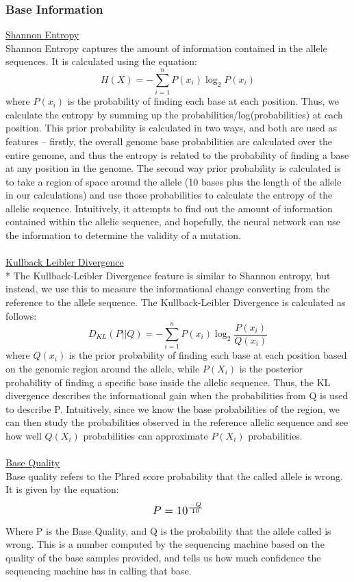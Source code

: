 \documentclass{article}
\begin{document}
\subsubsection{Base Information}
\underline{Shannon Entropy}\\
Shannon Entropy captures the amount of information contained in the allele sequences. It is calculated using the equation:
\begin{equation}
H(X) = -\sum_{i=1}^{n}P(x_i)\log_{2}P(x_i)
\end{equation}
where $P(x_i)$ is the probability of finding each base at each position. Thus, we calculate the entropy by summing up the probabilities/log(probabilities) at each position. This prior probability is calculated in two ways, and both are used as features -- firstly, the overall genome base probabilities are calculated over the entire genome, and thus the entropy is related to the probability of finding a base at any position in the genome. The second way prior probability is calculated is to take a region of space around the allele (10 bases plus the length of the allele in our calculations) and use those probabilities to calculate the entropy of the allelic sequence. Intuitively, it attempts to find out the amount of information contained within the allelic sequence, and hopefully, the neural network can use the information to determine the validity of a mutation.\\\\
\underline{Kullback Leibler Divergence}\\*
The Kullback-Leibler Divergence feature is similar to Shannon entropy, but instead, we use this to measure the informational change converting from the reference to the allele sequence. The Kullback-Leibler Divergence is calculated as follows:
\begin{equation}
D_{KL}(P||Q) = -\sum_{i=1}^{n}P(x_i)\log_{2}{\frac{P(x_i)}{Q(x_i)}}
\end{equation}
where $Q(x_i)$ is the prior probability of finding each base at each position based on the genomic region around the allele, while $P(X_i)$ is the posterior probability of finding a specific base inside the allelic sequence. Thus, the KL divergence describes the informational gain when the probabilities from Q is used to describe P. Intuitively, since we know the base probabilities of the region, we can then study the probabilities observed in the reference allelic sequence and see how well $Q(X_i)$ probabilities can approximate $P(X_i)$ probabilities.\\\\
\underline{Base Quality}\\
Base quality refers to the Phred score probability that the called allele is wrong. It is given by the equation:
\[ \scalebox{1.2}{$P=10^{\frac{-Q}{10}}$} \]
Where P is the Base Quality, and Q is the probability that the allele called is wrong. This is a number computed by the sequencing machine based on the quality of the base samples provided, and tells us how much confidence the sequencing machine has in calling that base.\\\\
\end{document}
